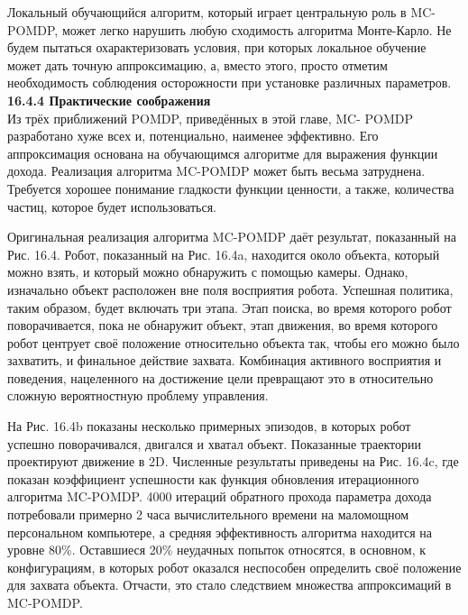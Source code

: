 \documentclass[10pt,a4paper]{article}
\begin{document}
Локальный обучающийся алгоритм, который играет центральную роль в MC- POMDP, может легко нарушить любую сходимость алгоритма Монте-Карло. Не будем пытаться охарактеризовать условия, при которых локальное обучение может дать точную аппроксимацию, а, вместо этого, просто отметим необходимость соблюдения осторожности при установке различных параметров.\\

\textbf{16.4.4	Практические соображения}\\

Из трёх приближений POMDP, приведённых в этой главе, MC- POMDP разработано хуже всех и, потенциально, наименее эффективно. Его аппроксимация основана на обучающимся алгоритме для выражения функции дохода. Реализация алгоритма MC-POMDP может быть весьма затруднена. Требуется хорошее понимание гладкости функции ценности, а также, количества частиц, которое будет использоваться.

Оригинальная реализация алгоритма MC-POMDP даёт результат, показанный на Рис. 16.4. Робот, показанный на Рис. 16.4a, находится около объекта, который можно взять, и который можно обнаружить с помощью камеры. Однако, изначально объект расположен вне поля восприятия робота. Успешная политика, таким образом, будет включать три этапа. Этап поиска, во время которого робот поворачивается, пока не обнаружит объект, этап движения, во время которого робот центрует своё положение относительно объекта так, чтобы его можно было захватить, и финальное действие захвата. Комбинация активного восприятия и поведения, нацеленного на достижение цели превращают это в относительно сложную вероятностную проблему управления.

На Рис. 16.4b показаны несколько примерных эпизодов, в которых робот успешно поворачивался, двигался и хватал объект. Показанные траектории проектируют движение в 2D. Численные результаты приведены на Рис. 16.4c, где показан коэффициент успешности как функция обновления итерационного алгоритма MC-POMDP. 4000 итераций обратного прохода параметра дохода потребовали примерно 2 часа вычислительного времени на маломощном персональном компьютере, а средняя эффективность алгоритма находится на уровне 80\%. Оставшиеся 20\% неудачных попыток относятся, в основном, к конфигурациям, в которых робот оказался неспособен определить своё положение для захвата объекта. Отчасти, это стало следствием множества аппроксимаций в MC-POMDP. 
\end{document}

